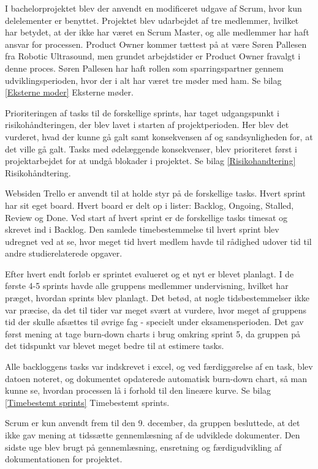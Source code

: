 I bachelorprojektet blev der anvendt en modificeret udgave af Scrum, hvor kun delelementer er benyttet. Projektet blev udarbejdet af tre medlemmer, hvilket har betydet, at der ikke har været en Scrum Master, og alle medlemmer har haft ansvar for processen. Product Owner kommer tættest på at være Søren Pallesen fra Robotic Ultrasound, men grundet arbejdstider er Product Owner fravalgt i denne proces. Søren Pallesen har haft rollen som sparringspartner gennem udviklingsperioden, hvor der i alt har været tre møder med ham. Se bilag \ref{Eksterne moder} Eksterne møder. 

Prioriteringen af tasks til de forskellige sprints, har taget udgangspunkt i risikohåndteringen, der blev lavet i starten af projektperioden. Her blev det vurderet, hvad der kunne gå galt samt konsekvensen af og sandsynligheden for, at det ville gå galt. Tasks med ødelæggende konsekvenser, blev prioriteret først i projektarbejdet for at undgå blokader i projektet. Se bilag \ref{Risikohandtering} Risikohåndtering.  

Websiden Trello er anvendt til at holde styr på de forskellige tasks. Hvert sprint har sit eget board. Hvert board er delt op i lister: Backlog, Ongoing, Stalled, Review og Done. Ved start af hvert sprint er de forskellige tasks timesat og skrevet ind i Backlog. Den samlede timebestemmelse til hvert sprint blev udregnet ved at se, hvor meget tid hvert medlem havde til rådighed udover tid til andre studierelaterede opgaver. 

Efter hvert endt forløb er sprintet evalueret og et nyt er blevet planlagt. I de første 4-5 sprints havde alle gruppens medlemmer undervisning, hvilket har præget, hvordan sprints blev planlagt. Det betød, at nogle tidsbestemmelser ikke var præcise, da det til tider var meget svært at vurdere, hvor meget af gruppens tid der skulle afsættes til øvrige fag - specielt under eksamensperioden. Det gav først mening at tage burn-down charts i brug omkring sprint 5, da gruppen på det tidspunkt var blevet meget bedre til at estimere tasks.

Alle backloggens tasks var indskrevet i excel, og ved færdiggørelse af en task, blev datoen noteret, og dokumentet opdaterede automatisk burn-down chart, så man kunne se, hvordan processen lå i forhold til den lineære kurve. Se bilag \ref{Timebestemt sprints} Timebestemt sprints. 

Scrum er kun anvendt frem til den 9. december, da gruppen besluttede, at det ikke gav mening at tidssætte gennemlæsning af de udviklede dokumenter. Den sidste uge blev brugt på gennemlæsning, ensretning og færdigudvikling af dokumentationen for projektet.  

